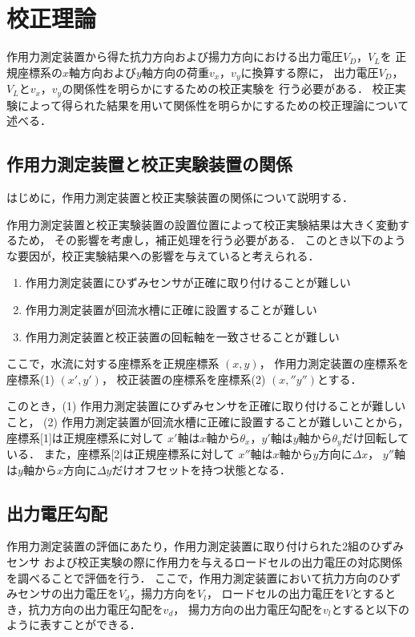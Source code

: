 \section{校正理論}
作用力測定装置から得た抗力方向および揚力方向における出力電圧$V_D$，$V_L$を
正規座標系の$x$軸方向および$y$軸方向の荷重$v_x$，$v_y$に換算する際に，
出力電圧$V_D$，$V_L$と$v_x$，$v_y$の関係性を明らかにするための校正実験を
行う必要がある．
校正実験によって得られた結果を用いて関係性を明らかにするための校正理論について述べる．

\subsection{作用力測定装置と校正実験装置の関係}
はじめに，作用力測定装置と校正実験装置の関係について説明する．

作用力測定装置と校正実験装置の設置位置によって校正実験結果は大きく変動するため，
その影響を考慮し，補正処理を行う必要がある．
このとき以下のような要因が，校正実験結果への影響を与えていると考えられる．

\begin{enumerate}[(1)]
    \item 作用力測定装置にひずみセンサが正確に取り付けることが難しい
    \item 作用力測定装置が回流水槽に正確に設置することが難しい
    \item 作用力測定装置と校正装置の回転軸を一致させることが難しい
\end{enumerate}

ここで，水流に対する座標系を正規座標系 $(x,y)$，
作用力測定装置の座標系を座標系(1) $(x',y')$，
校正装置の座標系を座標系(2) $(x,'' y'')$とする．

このとき，(1) 作用力測定装置にひずみセンサを正確に取り付けることが難しいこと，
(2) 作用力測定装置が回流水槽に正確に設置することが難しいことから，
座標系[1]は正規座標系に対して
$x'$軸は$x$軸から$\theta_x$，$y'$軸は$y$軸から$\theta_y$だけ回転している．
また，座標系[2]は正規座標系に対して
$x''$軸は$x$軸から$y$方向に$\Delta x$，
$y''$軸は$y$軸から$x$方向に$\Delta y$だけオフセットを持つ状態となる．

\newpage

\subsection{出力電圧勾配}

作用力測定装置の評価にあたり，作用力測定装置に取り付けられた2組のひずみセンサ
および校正実験の際に作用力を与えるロードセルの出力電圧の対応関係を調べることで評価を行う．
ここで，作用力測定装置において抗力方向のひずみセンサの出力電圧を$V_d$，揚力方向を$V_l$，
ロードセルの出力電圧を$V$とするとき，抗力方向の出力電圧勾配を$v_d$，
揚力方向の出力電圧勾配を$v_l$とすると以下のように表すことができる．

